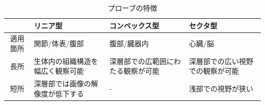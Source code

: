 \begin{table}[htb]
\centering
\caption{プローブの特徴}
\label{table_probe}
\begin{tabular}{|c|p{3cm}|p{3cm}|p{3cm}|}%
\hline
  &\hfil リニア型 \hfil & \hfil コンベックス型 \hfil & \hfil セクタ型 \hfil  
  \\ \hline
\hfil 適用箇所 \hfil &\hfil 関節/体表/腹部 \hfil & \hfil 腹部/臓器内 \hfil & \hfil 心臓/脳 \hfil    
\\ \hline
長所   & \hfil 生体内の組織構造を幅広く観察可能 \hfil & \hfil  深層部での広範囲にわたる観察が可能 \hfil & \hfil 深層部での広い視野での観察が可能 \hfil
 \\ \hline
短所  & \hfil 深層部では画像の解像度が低下する\hfil &\hfil - \hfil& \hfil 浅部での視野が狭い \hfil \\ \hline
\end{tabular}
\end{table}

